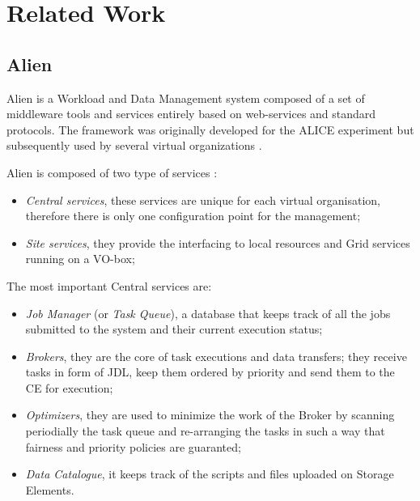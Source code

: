 \section{Related Work}
\label{sec:related}
\subsection{Alien}
Alien is a Workload and Data Management system composed of a 	set of middleware tools and services entirely based on web-services and standard protocols. The framework was originally developed for the ALICE experiment \cite{Alice1995} but subsequently used by several virtual organizations \cite{McClatechey2003,GPCALMA}. 

Alien is composed of two type of services \cite{Bagnasco2010}:
\begin{itemize}
\item
\emph{Central services}, these services are unique for each virtual organisation, therefore there is only one  configuration point for the management;
\item \emph{Site services}, they provide the interfacing to local resources and Grid services running on a VO-box;
\end{itemize}

The most important Central services are:
\begin{itemize}
\item \emph{Job Manager} (or \emph{Task Queue}), a database that keeps track of all the jobs submitted to the system and their current execution status;
\item \emph{Brokers}, they are the core of task executions and data transfers; they receive tasks in form of JDL,  keep them ordered by priority and send them to the CE for execution;
\item \emph{Optimizers}, they are used to minimize the work of the Broker by scanning periodially the task queue and re-arranging the tasks in such a way that fairness and priority policies are guaranted;
\item \emph{Data Catalogue}, it keeps track of the scripts and files uploaded on Storage Elements.
\end{itemize}



